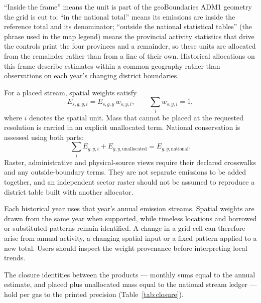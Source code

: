 \documentclass[essd]{copernicus}
\begin{document}
``Inside the frame'' means the unit is part of the geoBoundaries ADM1 geometry the grid is cut to; ``in the national total'' means its emissions are inside the reference total and its denominator; ``outside the national statistical tables'' (the phrase used in the map legend) means the provincial activity statistics that drive the controls print the four provinces and a remainder, so these units are allocated from the remainder rather than from a line of their own. Historical allocations on this frame describe estimates within a common geography rather than observations on each year's changing district boundaries.

For a placed stream, spatial weights satisfy
\begin{equation}
 E_{s,g,y,i}=E_{s,g,y}\,w_{s,y,i},\qquad
 \sum_i w_{s,y,i}=1,
 \label{eq:spatial}
\end{equation}
where $i$ denotes the spatial unit. Mass that cannot be placed at the requested resolution is carried in an explicit unallocated term. National conservation is assessed using both parts:
\begin{equation}
 \sum_i E_{g,y,i}+E_{g,y,\mathrm{unallocated}}
 =E_{g,y,\mathrm{national}}.
 \label{eq:spatial_closure}
\end{equation}
Raster, administrative and physical-source views require their declared crosswalks and any outside-boundary terms. They are not separate emissions to be added together, and an independent sector raster should not be assumed to reproduce a district table built with another allocator.

Each historical year uses that year's annual emission streams. Spatial weights are drawn from the same year when supported, while timeless locations and borrowed or substituted patterns remain identified. A change in a grid cell can therefore arise from annual activity, a changing spatial input or a fixed pattern applied to a new total. Users should inspect the weight provenance before interpreting local trends.

The closure identities between the products --- monthly sums equal to the annual estimate, and placed plus unallocated mass equal to the national stream ledger --- hold per gas to the printed precision (Table~\ref{tab:closure}).

\end{document}
